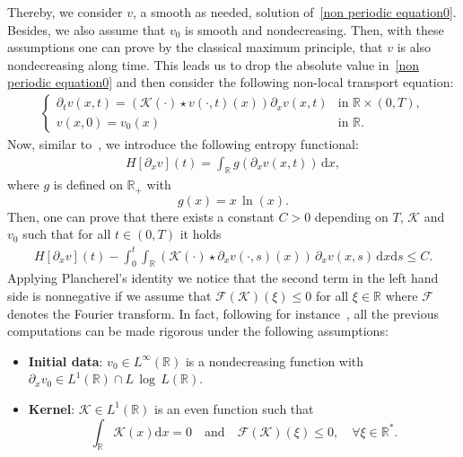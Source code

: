 \documentclass[11pt]{amsart}
\newcommand{\K}{\mathcal{K}}
\newcommand{\dd}{\mathrm{d}}
\newcommand{\pa}{\partial}
\newcommand{\F}{\mathcal{F}}
\newcommand{\R}{\mathbb{R}}
\begin{document}
Thereby, we consider $v$, a smooth as needed, solution of~\eqref{non periodic equation0}. Besides, we also assume that $v_0$ is smooth and nondecreasing. Then, with these assumptions one can prove 
by the classical maximum principle, that $v$ is also nondecreasing along time. This leads us to drop the absolute value in~\eqref{non periodic equation0} and then consider the following non-local transport equation: 
\begin{align}\label{non periodic equation}
    \begin{cases}
  \partial_t v(x,t) = \left( \K(\cdot) \star v(\cdot,t)(x)\right)
 \partial_xv(x,t) & \mbox{in } \mathbb{R} \times (0, T), \\
  v(x,0) = v_0(x) & \mbox{in } \mathbb{R}. 
\end{cases}
\end{align}
Now, similar to~\cite{1}, we introduce the following entropy functional:
\begin{align}\label{1.defent}
    H[\partial_x v](t) = \int_\R g\left(\pa_x v(x,t)\right) \, \dd x,
\end{align}
where $g$ is defined on $\R_+$ with
\begin{equation}\label{1.defg}
     g(x) = x \, \ln(x).        
\end{equation}
Then, one can prove that there exists a constant $C>0$ depending on $T$, $\K$ and $v_0$ such that for all $t \in (0,T)$ it holds
\begin{align}\label{1.entv}
    H[\pa_x v](t) - \int_0^t \int_\R \left(\K(\cdot)\star \pa_x v(\cdot,s)(x)\right) \, \pa_x v(x,s) \, \dd x \dd s \leq C.
\end{align}
Applying Plancherel's identity we notice that the second term in the left hand side is nonnegative if we assume that $\F(\K)(\xi) \leq 0$ for all $\xi \in \R$ where $\F$ denotes the Fourier transform. In fact, following for instance~\cite{1}, all the previous computations can be made rigorous under the following assumptions:\smallskip
\begin{itemize}
\item[\textbf{(H1)}] {\bf{Initial data}}: $v_0 \in L^\infty(\R)$ is a nondecreasing function with $\partial_x v_0 \in L^1(\mathbb{R}) \cap L\,\log\,L(\mathbb{R})$.

\item[\textbf{(H2)}] {\bf Kernel}: $\K \in L^1(\R)$ is an even function such that
\begin{equation}\label{fourier transform is negative}
\displaystyle \int_{\R} \mathcal{K}(x) \dd x = 0\quad \mbox{and}\quad 
\mathcal{F}(\mathcal{K})(\xi) \leq 0, \quad \forall \xi \in \R^{*}. 
\end{equation}
\end{itemize}
\end{document}
